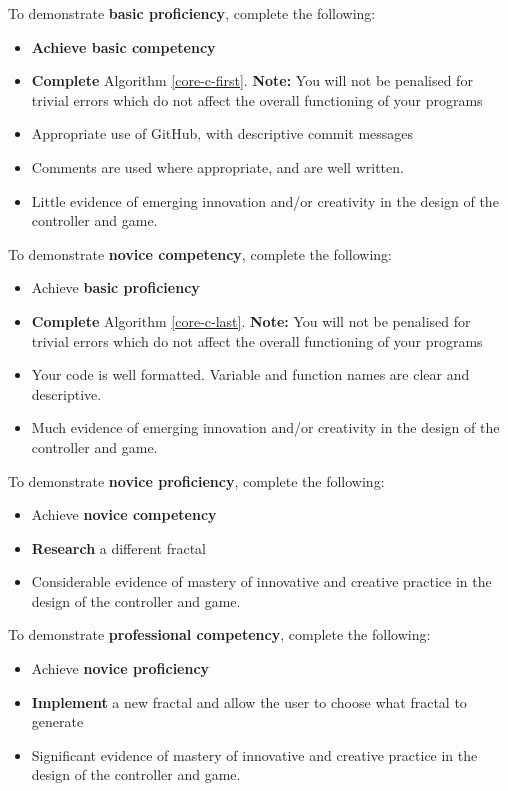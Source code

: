\documentclass{../../../../fal_assignment}
\begin{document}
	To demonstrate \textbf{basic proficiency}, complete the following:
	\begin{itemize}
		\item \textbf{Achieve basic competency}
		\item \textbf{Complete} Algorithm \ref{core-c-first}. \textbf{Note:} You will not be penalised for trivial errors which do not
		affect the overall functioning of your programs
		\item Appropriate use of GitHub, with descriptive commit messages 
		\item Comments are used where appropriate, and are well written.
		\item Little evidence of emerging innovation and/or creativity in the design of the controller and game.
	\end{itemize}
	
	To demonstrate \textbf{novice competency}, complete the following:
	\begin{itemize}
		\item Achieve \textbf{basic proficiency}
		\item \textbf{Complete} Algorithm \ref{core-c-last}. \textbf{Note:} You will not be penalised for trivial errors which do not
		affect the overall functioning of your programs
		\item Your code is well formatted. Variable and function names are clear and descriptive.
		\item Much evidence of emerging innovation and/or creativity in the design of the controller and game.
	\end{itemize}
	
	To demonstrate \textbf{novice proficiency}, complete the following:
	\begin{itemize}
		\item Achieve \textbf{novice competency}
		\item \textbf{Research} a different fractal
		\item Considerable evidence of mastery of innovative and creative practice in the design of the controller and game.
	\end{itemize}
	
	To demonstrate \textbf{professional competency}, complete the following:
	\begin{itemize}
		\item Achieve \textbf{novice proficiency}
		\item \textbf{Implement} a new fractal and allow the user to choose what fractal to generate
		\item Significant evidence of mastery of innovative and creative practice  in the design of the controller and game.
	\end{itemize}
	
	
\end{document}
